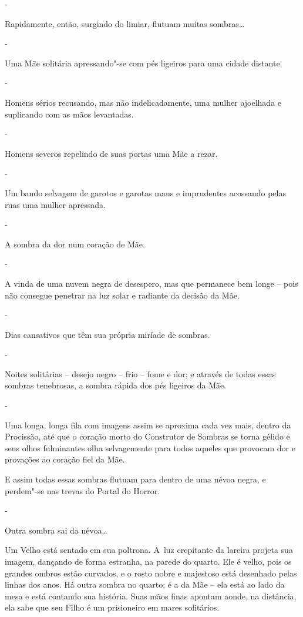 -

Rapidamente, então, surgindo do limiar, flutuam muitas sombras…

-

Uma Mãe solitária apressando"-se com pés ligeiros para uma cidade
distante.

-

Homens sérios recusando, mas não indelicadamente, uma mulher ajoelhada e
suplicando com as mãos levantadas.

-

Homens severos repelindo de suas portas uma Mãe a rezar.

-

Um bando selvagem de garotos e garotas maus e imprudentes acossando
pelas ruas uma mulher apressada.

-

A sombra da dor num coração de Mãe.

-

A vinda de uma nuvem negra de desespero, mas que permanece bem longe --
pois não consegue penetrar na luz solar e radiante da decisão da Mãe.

-

Dias cansativos que têm sua própria miríade de sombras.

-

Noites solitárias -- desejo negro -- frio -- fome e dor; e através de
todas essas sombras tenebrosas, a sombra rápida dos pés ligeiros da Mãe.

-

Uma longa, longa fila com imagens assim se aproxima cada vez mais,
dentro da Procissão, até que o coração morto do Construtor de Sombras se
torna gélido e seus olhos fulminantes olha selvagemente para todos
aqueles que provocam dor e provações ao coração fiel da Mãe.

E assim todas essas sombras flutuam para dentro de uma névoa negra, e
perdem"-se nas trevas do Portal do Horror.

-

Outra sombra sai da névoa…

Um Velho está sentado em sua poltrona. A~luz crepitante da lareira
projeta sua imagem, dançando de forma estranha, na parede do quarto. Ele
é velho, pois os grandes ombros estão curvados, e o rosto nobre e
majestoso está desenhado pelas linhas dos anos. Há outra sombra no
quarto; é a da Mãe -- ela está ao lado da mesa e está contando sua
história. Suas mãos finas apontam aonde, na distância, ela sabe que seu
Filho é um prisioneiro em mares solitários.

